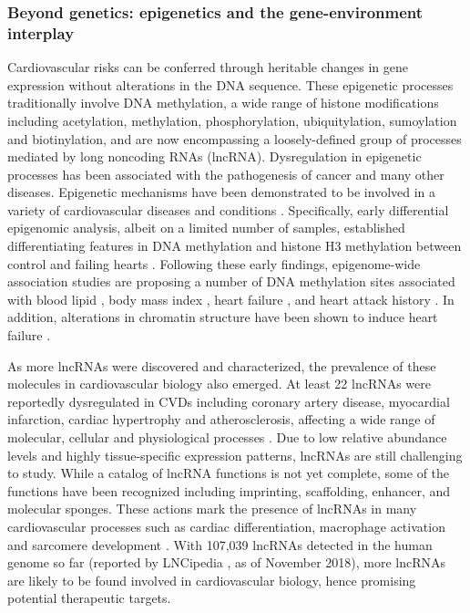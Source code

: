 \documentclass[letter]{bioinfo}
\begin{document}
\subsubsection*{Beyond genetics: epigenetics and the gene-environment interplay}	
	Cardiovascular risks can be conferred through heritable changes in gene expression without alterations in the DNA sequence.  These epigenetic processes traditionally involve DNA methylation, a wide range of histone modifications including acetylation, methylation, phosphorylation, ubiquitylation, sumoylation and biotinylation, and are now encompassing a loosely-defined group of processes mediated by long noncoding RNAs (lncRNA). Dysregulation in epigenetic processes has been associated with the pathogenesis of cancer and many other diseases. Epigenetic mechanisms have been demonstrated to be involved in a variety of cardiovascular diseases and conditions \citep{Udali:2013:Cardiovascular,AbiKhalil:2014:emerging,Muka:2016:role,Gidlof:2016:Ischemic}.
	Specifically, early differential epigenomic analysis, albeit on a limited number of samples, established differentiating features in DNA methylation and histone H3 methylation between control and failing hearts \citep{Movassagh:2011:Distinct}. Following these early findings, epigenome-wide association studies are proposing a number of DNA methylation sites associated with blood lipid \citep{Irvin:2014:Epigenomewide}, body mass index \citep{Dick:2014:DNA, Wahl:2017:Epigenomewide}, heart failure \citep{Meder:2017:EpigenomeWide}, and heart attack history \citep{Rask-Andersen:2016:Epigenomewide}. In addition, alterations in chromatin structure have been shown to induce heart failure \citep{Rosa-Garrido:2017:HighResolution}.
	
	As more lncRNAs were discovered and characterized, the prevalence of these molecules in cardiovascular biology also emerged.
	At least 22 lncRNAs were reportedly dysregulated in CVDs including coronary artery disease, myocardial infarction, cardiac hypertrophy and atherosclerosis, affecting a wide range of molecular, cellular and physiological processes \citep{Das:2018:Deciphering, Xu:2018:Targeting}. Due to low relative abundance levels and highly tissue-specific expression patterns, lncRNAs are still challenging to study.
	While a catalog of lncRNA functions is not yet complete, some of the functions have been recognized including imprinting, scaffolding, enhancer, and molecular sponges. These actions mark the presence of lncRNAs in many cardiovascular processes such as cardiac differentiation, macrophage activation and sarcomere development \citep{Sallam:2018:Long}.
	With 107,039 lncRNAs detected in the human genome so far (reported by LNCipedia \citep{Volders:2018:LNCipedia}, as of November 2018), more lncRNAs are likely to be found involved in cardiovascular biology, hence promising potential therapeutic targets.
\end{document}
